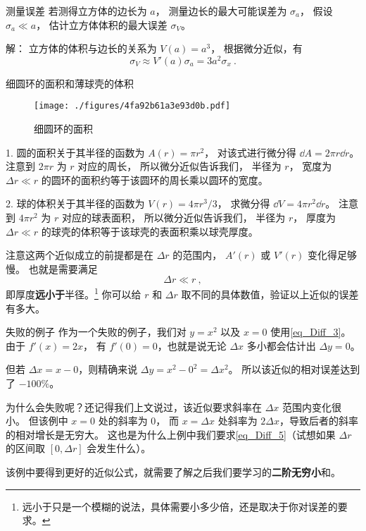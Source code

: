 \begin{example}{测量误差}\label{ex_Diff_1}
若测得立方体的边长为 $a$， 测量边长的最大可能误差为 $\sigma_a$， 假设 $\sigma_a \ll a$， 估计立方体体积的最大误差 $\sigma_V$。

解： 立方体的体积与边长的关系为 $V(a)=a^3$， 根据微分近似，有
\begin{equation}
\sigma_V \approx V'(a) \sigma_a = 3a^2 \sigma_x~.
\end{equation}
\end{example}

\begin{example}{细圆环的面积和薄球壳的体积}\label{ex_Diff_2}
\begin{figure}[ht]
\centering
\texttt{[image: ./figures/4fa92b61a3e93d0b.pdf]}
\caption{细圆环的面积} \label{fig_Diff_2}
\end{figure}

1. 圆的面积关于其半径的函数为 $A(r) = \pi r^2$， 对该式进行微分得 $\dd{A} = 2\pi r\dd{r}$。 注意到 $2\pi r$ 为 $r$ 对应的周长， 所以微分近似告诉我们， 半径为 $r$， 宽度为 $\Delta r \ll r$ 的圆环的面积约等于该圆环的周长乘以圆环的宽度。

2. 球的体积关于其半径的函数为 $V(r) = 4\pi r^3/3$， 求微分得 $\dd{V} = 4\pi r^2 \dd{r}$。 注意到 $4\pi r^2$ 为 $r$ 对应的球表面积， 所以微分近似告诉我们， 半径为 $r$， 厚度为 $\Delta r \ll r$ 的球壳的体积等于该球壳的表面积乘以球壳厚度。

注意这两个近似成立的前提都是在 $\Delta r$ 的范围内， $A'(r)$ 或 $V'(r)$ 变化得足够慢。 也就是需要满足
\begin{equation}\label{eq_Diff_5}
\Delta r \ll r~,
\end{equation}
即厚度\textbf{远小于}半径。\footnote{远小于只是一个模糊的说法，具体需要小多少倍，还是取决于你对误差的要求。} 你可以给 $r$ 和 $\Delta r$ 取不同的具体数值，验证以上近似的误差有多大。
\end{example}

\begin{example}{失败的例子}
作为一个失败的例子，我们对 $y = x^2$ 以及 $x=0$ 使用\autoref{eq_Diff_3}。 由于 $f'(x) = 2x$， 有 $f'(0) = 0$，也就是说无论 $\Delta x$ 多小都会估计出 $\Delta y = 0$。

但若 $\Delta x = x - 0$，则精确来说 $\Delta y = x^2 - 0^2 = \Delta x^2$。 所以该近似的相对误差达到了 $-100\%$。

为什么会失败呢？还记得我们上文说过，该近似要求斜率在 $\Delta x$ 范围内变化很小。 但该例中 $x=0$ 处的斜率为 0， 而 $x=\Delta x$ 处斜率为 $2\Delta x$，导致后者的斜率的相对增长是无穷大。 这也是为什么上例中我们要求\autoref{eq_Diff_5}（试想如果 $\Delta r$ 的区间取 $[0, \Delta r]$ 会发生什么）。
\end{example}

该例中要得到更好的近似公式，就需要了解之后我们要学习的\textbf{二阶无穷小}和。
